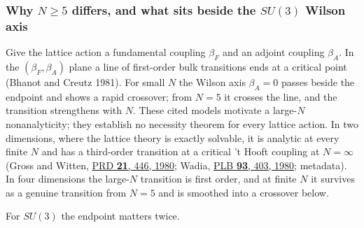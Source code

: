 \documentclass[11pt,a4paper]{article}
\begin{document}
\hypertarget{why-nge5-differs-and-what-sits-beside-the-su3-wilson-axis}{%
\subsubsection{\texorpdfstring{Why \(N\ge5\) differs, and what sits
beside the \(SU(3)\) Wilson
axis}{Why N\textbackslash ge5 differs, and what sits beside the SU(3) Wilson axis}}\label{why-nge5-differs-and-what-sits-beside-the-su3-wilson-axis}}

Give the lattice action a fundamental coupling \(\beta_F\) and an
adjoint coupling \(\beta_A\). In the \((\beta_F,\beta_A)\) plane a line
of first-order bulk transitions ends at a critical point (Bhanot and
Creutz 1981). For small \(N\) the Wilson axis \(\beta_A=0\) passes
beside the endpoint and shows a rapid crossover; from \(N=5\) it crosses
the line, and the transition strengthens with \(N\). These cited models
motivate a large-\(N\) nonanalyticity; they establish no necessity
theorem for every lattice action. In two dimensions, where the lattice
theory is exactly solvable, it is analytic at every finite \(N\) and has
a third-order transition at a critical 't Hooft coupling at \(N=\infty\)
(Gross and Witten, \href{https://doi.org/10.1103/PhysRevD.21.446}{PRD
\textbf{21}, 446, 1980}; Wadia,
\href{https://doi.org/10.1016/0370-2693(80)90353-6}{PLB \textbf{93},
403, 1980}; metadata). In four dimensions the large-\(N\) transition is
first order, and at finite \(N\) it survives as a genuine transition
from \(N=5\) and is smoothed into a crossover below.

For \(SU(3)\) the endpoint matters twice.
\end{document}
